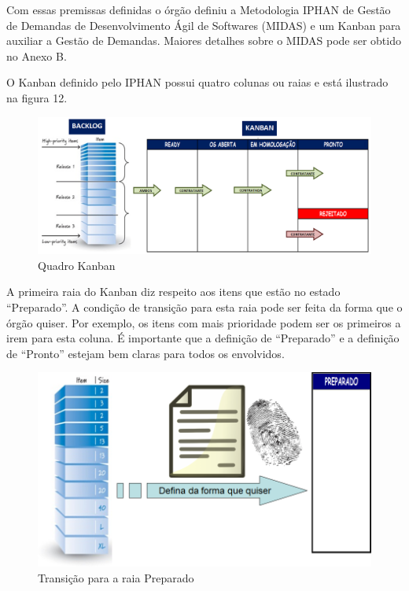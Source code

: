 Com essas premissas definidas o órgão definiu a Metodologia IPHAN de Gestão de Demandas de Desenvolvimento Ágil de Softwares (MIDAS) e um Kanban para auxiliar a Gestão de Demandas. Maiores detalhes sobre o MIDAS pode ser obtido no Anexo B. 

O Kanban definido pelo IPHAN possui quatro colunas ou raias e está ilustrado na figura 12.

\begin{figure}[H]
		\centering
		\label{fig05}
			\includegraphics[scale=0.5]{figuras/kanbanIPHAN1.png}
		\caption{Quadro Kanban  \cite{parente}}
\end{figure}

A primeira raia do Kanban diz respeito aos itens que estão no estado “Preparado”. A condição de transição para esta raia pode ser feita da forma que o órgão quiser. Por exemplo, os itens com mais prioridade podem ser os primeiros a irem para esta coluna. É importante que a definição de “Preparado” e a definição de “Pronto” estejam bem claras para todos os envolvidos.

\begin{figure}[H]
		\centering
		\label{fig06}
			\includegraphics[scale=0.5]{figuras/kanbanIPHAN2.png}
		\caption{Transição para a raia Preparado \cite{parente}}
\end{figure}

